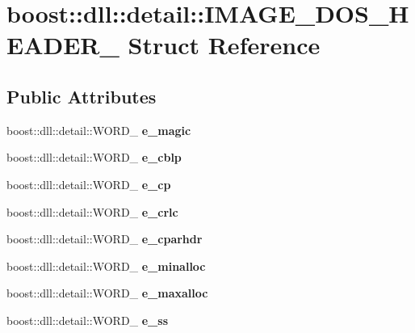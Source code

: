 \hypertarget{a00145}{}\section{boost\+:\+:dll\+:\+:detail\+:\+:I\+M\+A\+G\+E\+\_\+\+D\+O\+S\+\_\+\+H\+E\+A\+D\+E\+R\+\_\+ Struct Reference}
\label{a00145}
\subsection*{Public Attributes}
\begin{DoxyCompactItemize}
\item 
boost\+::dll\+::detail\+::\+W\+O\+R\+D\+\_\+ {\bfseries e\+\_\+magic}\hypertarget{a00145_a3bd0e053bae556df0900f4239d084c3f}{}\label{a00145_a3bd0e053bae556df0900f4239d084c3f}

\item 
boost\+::dll\+::detail\+::\+W\+O\+R\+D\+\_\+ {\bfseries e\+\_\+cblp}\hypertarget{a00145_a841bd5f17ed2800e535b193ea28cbad7}{}\label{a00145_a841bd5f17ed2800e535b193ea28cbad7}

\item 
boost\+::dll\+::detail\+::\+W\+O\+R\+D\+\_\+ {\bfseries e\+\_\+cp}\hypertarget{a00145_a87105bdb063d329bff5170ddd0fd7da8}{}\label{a00145_a87105bdb063d329bff5170ddd0fd7da8}

\item 
boost\+::dll\+::detail\+::\+W\+O\+R\+D\+\_\+ {\bfseries e\+\_\+crlc}\hypertarget{a00145_a3e83364e15b65d090ea42acba2462919}{}\label{a00145_a3e83364e15b65d090ea42acba2462919}

\item 
boost\+::dll\+::detail\+::\+W\+O\+R\+D\+\_\+ {\bfseries e\+\_\+cparhdr}\hypertarget{a00145_af25651cb91f8a7a7ce62848098ae5f50}{}\label{a00145_af25651cb91f8a7a7ce62848098ae5f50}

\item 
boost\+::dll\+::detail\+::\+W\+O\+R\+D\+\_\+ {\bfseries e\+\_\+minalloc}\hypertarget{a00145_adcb216e4dc15485d7d87bceca94d835a}{}\label{a00145_adcb216e4dc15485d7d87bceca94d835a}

\item 
boost\+::dll\+::detail\+::\+W\+O\+R\+D\+\_\+ {\bfseries e\+\_\+maxalloc}\hypertarget{a00145_a66c0ff2d7e1d23973c54e49dfd2e892d}{}\label{a00145_a66c0ff2d7e1d23973c54e49dfd2e892d}

\item 
boost\+::dll\+::detail\+::\+W\+O\+R\+D\+\_\+ {\bfseries e\+\_\+ss}\hypertarget{a00145_a69354f6406f23c5d1c4bcb5851824cdf}{}\label{a00145_a69354f6406f23c5d1c4bcb5851824cdf}


\end{DoxyCompactItemize}
